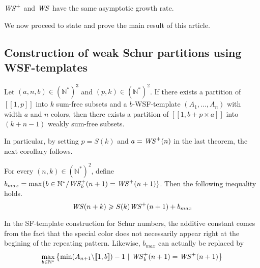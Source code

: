 \begin{remark}
\(\mathit{WS}^+\) and \(\mathit{WS}\) have the same asymptotic growth rate.
\end{remark}

We now proceed to state and prove the main result of this article.


\subsection{Construction of weak Schur partitions using WSF-templates}

\begin{theorem}
Let \((a,n,b) \in (\mathbb{N}^*)^3\) and \( (p,k) \in (\mathbb{N}^*)^2\). If there exists a partition of \([\![1,p]\!]\) 
into \(k\) sum-free subsets and a \(b\)-WSF-template \((A_1,...,A_n)\) with width \(a\) and \(n\) colors, 
then there exists a partition of \([\![1, b+p \times a]\!]\) into \((k+n-1)\) weakly sum-free subsets.
\end{theorem}

In particular, by setting \(p = S(k)\) and \(a = \mathit{WS}^+(n)\) in the last theorem, the next corollary follows.

\begin{corollary}
For every \((n,k) \in (\mathbb{N}^*)^2\), define \( b_{max} = \max \{b\in \mathbb{N}^*/ \mathit{WS}_b^+(n+1) = \mathit{WS}^+(n+1)\}\).
Then the following inequality holds.
\[\mathit{WS}(n+k) \geqslant S(k) \mathit{WS}^+(n+1)+b_{max}\]
\end{corollary}

\begin{remark}
In the SF-template construction for Schur numbers, the additive constant comes from the fact that the special color does
not necessarily appear right at the begining of the repeating pattern. Likewise, \(b_{max}\) can actually be replaced by \\
\[
\max_{b \in \mathbb{N}^*} \left\{\min (A_{n+1} \backslash [\![1, b ]\!]) - 1~|~ \mathit{WS}_b^+(n+1) = \mathit{WS}^+(n+1) \right\}
\]
\end{remark}

